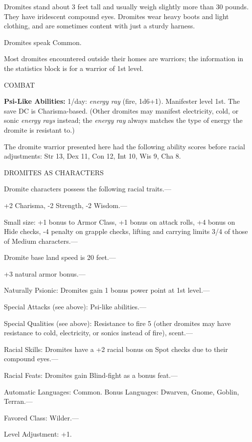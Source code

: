 \documentclass{article}
\begin{document}
Dromites stand about 3 feet tall and usually weigh slightly more than 30 pounds. 
They have iridescent compound eyes. Dromites wear heavy boots and light clothing, 
and are sometimes content with just a sturdy harness. 

Dromites speak Common.

Most dromites encountered outside their homes are warriors; the information in 
the statistics block is for a warrior of 1st level.

COMBAT

\textbf{Psi-Like Abilities:} 1/day: \textit{energy ray }(fire, 1d6+1)\textit{. 
}Manifester level 1st. The save DC is Charisma-based. (Other dromites may manifest 
electricity, cold, or sonic \textit{energy rays }instead; the \textit{energy ray 
}always matches the type of energy the dromite is resistant to.)

The dromite warrior presented here had the following ability scores before racial 
adjustments: Str 13, Dex 11, Con 12, Int 10, Wis 9, Cha 8.

DROMITES AS CHARACTERS

Dromite characters possess the following racial traits.--- 

\parindent=3pt
+2 Charisma, -2 Strength, -2 Wisdom.---

\parindent=0pt
Small size: +1 bonus to Armor Class, +1 bonus on attack rolls, +4 bonus on Hide 
checks, -4 penalty on grapple checks, lifting and carrying limits 3/4 of those 
of Medium characters.---

Dromite base land speed is 20 feet.--- 

\parindent=3pt
+3 natural armor bonus.---

\parindent=0pt
Naturally Psionic: Dromites gain 1 bonus power point at 1st level.---

Special Attacks (see above): Psi-like abilities.---

Special Qualities (see above): Resistance to fire 5 (other dromites may have resistance 
to cold, electricity, or sonics instead of fire), scent.--- 

\parindent=3pt
Racial Skills: Dromites have a +2 racial bonus on Spot checks due to their compound 
eyes.--- 

Racial Feats: Dromites gain Blind-fight as a bonus feat.---

Automatic Languages: Common. Bonus Languages: Dwarven, Gnome, Goblin, Terran.---

Favored Class: Wilder.---

Level Adjustment: +1.
\end{document}

